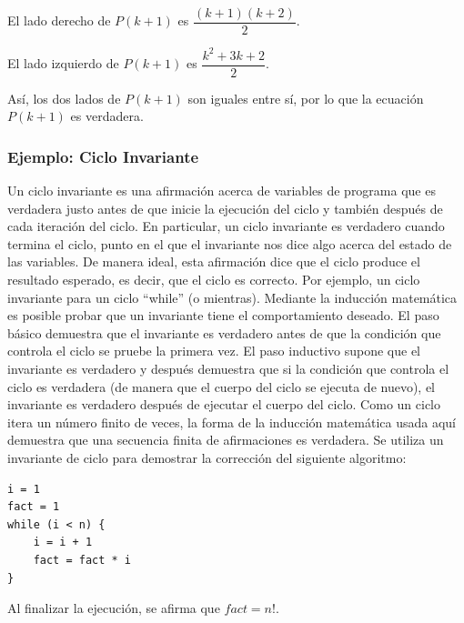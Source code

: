 \documentclass{article}
\begin{document}
\noindent El lado derecho de $P(k + 1)$ es $\dfrac{(k + 1)(k + 2)}{2}$. 

\noindent El lado izquierdo de $P(k + 1)$ es $\dfrac{k^2 + 3k + 2}{2}$.

\begin{center}
\end{center}


Así, los dos lados de $P(k + 1)$ son iguales entre sí, por lo que la ecuación $P(k + 1)$ es verdadera.

\subsubsection{Ejemplo: Ciclo Invariante}
\label{sec:ejemplo-ciclo-invariante}

Un ciclo invariante es una afirmación acerca de variables de programa que es verdadera justo antes de que inicie la ejecución del ciclo y también después de cada iteración del ciclo. En particular, un ciclo invariante es verdadero cuando termina el ciclo, punto en el que el invariante nos dice algo acerca del estado de las variables. De manera ideal, esta afirmación dice que el ciclo produce el resultado esperado, es decir, que el ciclo es correcto. Por ejemplo, un ciclo invariante para un ciclo ``while'' (o mientras). Mediante la inducción matemática es posible probar que un invariante tiene el comportamiento deseado. El paso básico demuestra que el invariante es verdadero antes de que la condición que controla el ciclo se pruebe la primera vez. El paso inductivo supone que el invariante es verdadero y después demuestra que si la condición que controla el ciclo es verdadera (de manera que el cuerpo del ciclo se ejecuta de nuevo), el invariante es verdadero después de ejecutar el cuerpo del ciclo. Como un ciclo itera un número finito de veces, la forma de la inducción matemática usada aquí demuestra que una secuencia finita de afirmaciones es verdadera. Se utiliza un invariante de ciclo para demostrar la corrección del siguiente algoritmo:

\begin{verbatim}
i = 1
fact = 1
while (i < n) {
    i = i + 1
    fact = fact * i
}
\end{verbatim}

Al finalizar la ejecución, se afirma que $fact = n!$. \bigskip
\end{document}
